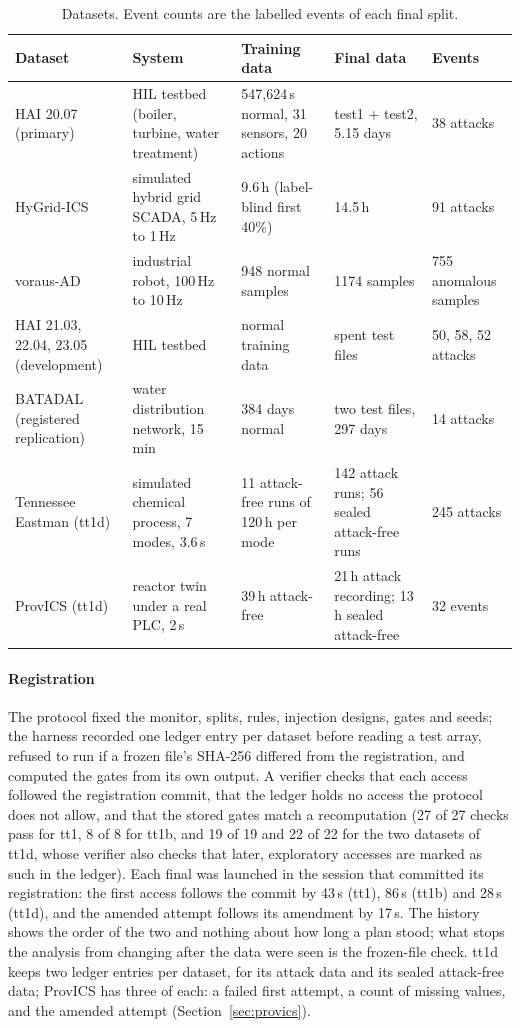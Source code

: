 \documentclass[sigconf,review,anonymous]{acmart}
\begin{document}
\begin{table}[t]
\caption{Datasets. Event counts are the labelled events of each final split.}
\label{tab:data}
\begin{tabularx}{\textwidth}{@{}LLLLL@{}}
\toprule
Dataset & System & Training data & Final data & Events \\
\midrule
HAI 20.07 (primary) & HIL testbed (boiler, turbine, water treatment) & 547,624\,s normal, 31 sensors, 20 actions & test1 + test2, 5.15 days & 38 attacks \\
HyGrid-ICS & simulated hybrid grid SCADA, 5\,Hz to 1\,Hz & 9.6\,h (label-blind first 40\%) & 14.5\,h & 91 attacks \\
voraus-AD & industrial robot, 100\,Hz to 10\,Hz & 948 normal samples & 1174 samples & 755 anomalous samples \\
HAI 21.03, 22.04, 23.05 (development) & HIL testbed & normal training data & spent test files & 50, 58, 52 attacks \\
BATADAL (registered replication) & water distribution network, 15\,min & 384 days normal & two test files, 297 days & 14 attacks \\
Tennessee Eastman (tt1d) & simulated chemical process, 7 modes, 3.6\,s & 11 attack-free runs of 120\,h per mode & 142 attack runs; 56 sealed attack-free runs & 245 attacks \\
ProvICS (tt1d) & reactor twin under a real PLC, 2\,s & 39\,h attack-free & 21\,h attack recording; 13\,h sealed attack-free & 32 events \\
\bottomrule
\end{tabularx}
\end{table}

\paragraph{Registration}
The protocol fixed the monitor, splits, rules, injection designs, gates and seeds; the harness
recorded one ledger entry per dataset before reading a test array, refused to run if a frozen file's
SHA-256 differed from the registration, and computed the gates from its own output. A verifier
checks that each access followed the registration commit, that the ledger holds no access the
protocol does not allow, and that the stored gates match a recomputation (27 of 27 checks pass for
tt1, 8 of 8 for tt1b, and 19 of 19 and 22 of 22 for the two datasets of tt1d, whose verifier also
checks that later, exploratory accesses are marked as such in the ledger). Each final was launched
in the session that committed its registration: the first access follows the commit by 43\,s (tt1),
86\,s (tt1b) and 28\,s (tt1d), and the amended attempt follows its amendment by 17\,s. The history shows
the order of the two and nothing about how long a plan stood; what stops the analysis from changing
after the data were seen is the frozen-file check. tt1d keeps two ledger
entries per dataset, for its attack data and its sealed attack-free data; ProvICS has three of each: a
failed first attempt, a count of missing values, and the amended attempt (Section~\ref{sec:provics}).
\end{document}
